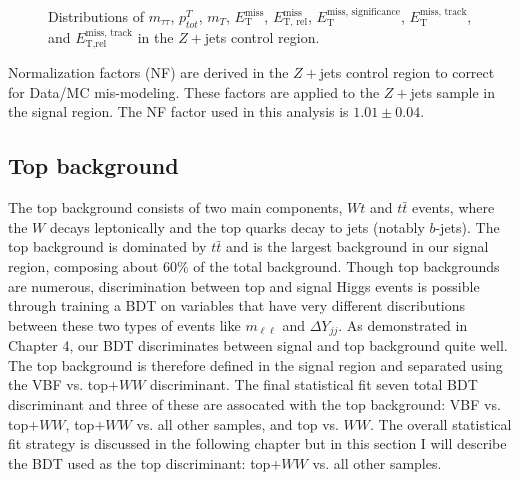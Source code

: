 \begin{figure}[!h]
{  }\hfill
  \hfill
{\caption{Distributions of $m_{\tau\tau}$, $p^T_{tot}$, $m_T$, $\ensuremath{E_{\text{T}}^{\text{miss}}}$, $\ensuremath{E_{\text{T, rel}}^{\text{miss}}}$, $\ensuremath{E_{\text{T}}^{\text{miss, significance}}}$, $\ensuremath{E_{\text{T}}^{\text{miss, track}}}$, and $\ensuremath{E_{\text{T,rel}}^{\text{miss, track}}}$ in the $Z+$jets control region.
\label{fig:DYCR3}}}
\end{figure}

Normalization factors (NF) are derived in the $Z+$jets control region to correct for Data/MC mis-modeling. These factors are applied to the $Z+$jets sample in the signal region. The NF factor used in this analysis is $1.01 \pm 0.04$. 

\subsection{Top background}
The top background consists of two main components, $Wt$ and $t\bar{t}$ events, where the $W$ decays leptonically and the top quarks decay to jets (notably $b$-jets). The top background is dominated by $t\bar{t}$ and is the largest background in our signal region, composing about $60\%$ of the total background. Though top backgrounds are numerous, discrimination between top and signal Higgs events is possible through training a BDT on variables that have very different discributions between these two types of events like $m_{\ell\ell}$ and $\Delta Y_{jj}$. As demonstrated in Chapter 4, our BDT discriminates between signal and top background quite well. The top background is therefore defined in the signal region and separated using the VBF vs. top$+WW$ discriminant. The final statistical fit seven total BDT discriminant and three of these are assocated with the top background: VBF vs. top$+WW$, top$+WW$ vs. all other samples, and top vs. $WW$. The overall statistical fit strategy is discussed in the following chapter but in this section I will describe the BDT used as the top discriminant: top$+WW$ vs. all other samples. 


